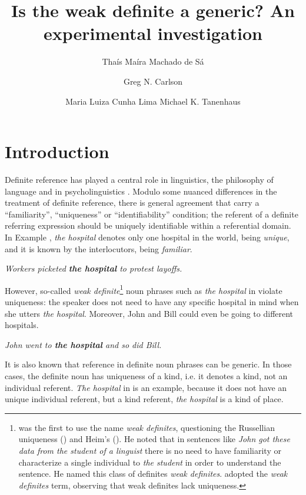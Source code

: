 \documentclass[output=paper,
modfonts
]{langscibook}
\title{Is the weak definite a generic? An experimental investigation}
\author{%
 Thaís Maíra Machado {de Sá}\affiliation{Universidade Federal de Minas Gerais}\and 
 Greg N. Carlson\affiliation{University of Rochester}\and 
 Maria Luiza {Cunha Lima}\affiliation{Universidade Federal de Minas Gerais}
 \lastand 
 Michael K. Tanenhaus\affiliation{University of Rochester \\ Nanjing Normal University}
}
\begin{document}
\maketitle

\section{Introduction}\label{sec:desaetal:1}
Definite reference has played a central role in linguistics, the philosophy of language and in psycholinguistics \citep{Russell1905, Strawson1950,Donnellan1966,ClarkMarshall1981,Heim1982,Aguilar-GuevaraZwarts2013}. Modulo some nuanced differences in the treatment of definite reference, there is general agreement that  carry a “familiarity”, “uniqueness” or “identifiability” condition; the referent of a definite referring expression should be uniquely identifiable within a referential domain. In Example , \textit{the hospital} denotes only one hospital in the world, being \textit{unique}, and it is known by the interlocutors, being \textit{familiar}.

\ea \label{ex:desaetal:1} 
\textit{Workers picketed \textbf{the hospital} to protest layoffs.}
\z

However, so-called \textit{weak definite}\footnote{\citet{Poesio1994} was the first to use the name \textit{weak definites}, questioning the Russellian uniqueness (\citeyear{Russell1905}) and Heim’s  (\citeyear{Heim1982}). He noted that in sentences like \textit{John got these data from the student of a linguist} there is no need to have familiarity or characterize a single individual to \textit{the student} in order  to understand the sentence. He named this class of definites \textit{weak definites}. \citet{CarlsonSussman2005} adopted the \textit{weak definites} term, observing that weak definites lack uniqueness.} noun phrases \citep{CarlsonSussman2005} such as \textit{the hospital} in  violate uniqueness: the speaker does not need to have any specific hospital in mind when she utters \textit{the hospital}. Moreover, John and Bill could even be going to different hospitals.

\ea \label{ex:desaetal:2}
\textit{John went to \textbf{the hospital} and so did Bill.}
\z

It is also known that reference in definite noun phrases can be generic. In those cases, the definite noun has uniqueness of a kind, i.e. it denotes a kind, not an individual referent. \textit{The hospital} in  is an example, because it does not have an unique individual referent, but a kind referent, \textit{the hospital} is a kind of place. 
\end{document}
